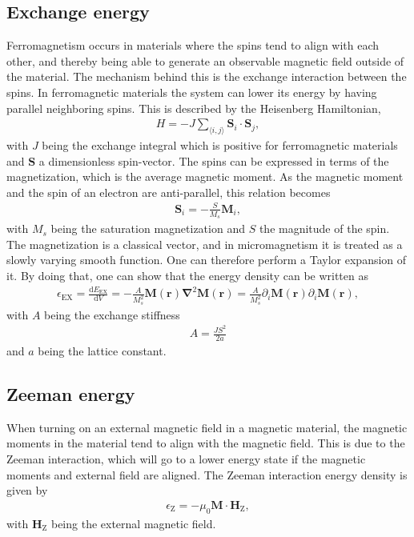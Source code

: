 \subsection{Exchange energy} \label{sec:Exchange}
Ferromagnetism occurs in materials where the spins tend to align with each other, and thereby being able to generate an observable magnetic field outside of the material. The mechanism behind this is the exchange interaction between the spins. In ferromagnetic materials the system can lower its energy by having parallel neighboring spins. This is described by the Heisenberg Hamiltonian,
\begin{align}
H = - J\sum_{\langle i,j\rangle} \mathbold{S}_i\cdot\mathbold{S}_j,
\end{align}
with $J$ being the exchange integral which is positive for ferromagnetic materials and $\mathbold{S}$ a dimensionless spin-vector. The spins can be expressed in terms of the magnetization, which is the average magnetic moment. As the magnetic moment and the spin of an electron are anti-parallel, this relation becomes
\begin{align}
\label{eq:ExchangeHamiltonian}
\mathbold{S}_i = -\frac{S}{M_s}\mathbold{M}_i,
\end{align}
with $M_s$ being the saturation magnetization and $S$ the magnitude of the spin. The magnetization is a classical vector, and in micromagnetism it is treated as a slowly varying smooth function. One can therefore perform a Taylor expansion of it. By doing that, one can show \cite{Project} that the energy density can be written as
\begin{align}
\epsilon_{\text{EX}} = \frac{\textrm{d} E_{\text{EX}}}{\textrm{d} V} = -\frac{A}{M_s^2}\mathbold{M}(\mathbold{r})\mathbold{\nabla}^2\mathbold{M}(\mathbold{r}) = \frac{A}{M_s^2}\partial_i\mathbold{M}(\mathbold{r})\partial_i\mathbold{M}(\mathbold{r}), \label{eq:exchDensity}
\end{align}
with $A$ being the exchange stiffness
\begin{align}
A = \frac{J S^2}{2a}
\end{align}
and $a$ being the lattice constant.

\subsection{Zeeman energy}
When turning on an external magnetic field in a magnetic material, the magnetic moments in the material tend to align with the magnetic field. This is due to the Zeeman interaction, which will go to a lower energy state if the magnetic moments and external field are aligned. The Zeeman interaction energy density is given by
\begin{align}
\epsilon_{\text{Z}} = -\mu_0 \mathbold{M}\cdot\mathbold{H}_{\text{Z}},
\end{align}
with $\mathbold{H}_{\text{Z}}$ being the external magnetic field.

